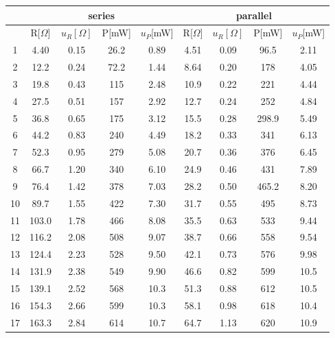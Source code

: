\documentclass[12pt]{article}
\begin{document}
\begin{table}[H]
\centering
\begin{tabular}{|c|c|c|c|c|c|c|c|c|}
\hline
   & \multicolumn{4}{c|}{series}      & \multicolumn{4}{c|}{parallel}      \\ \hline
   & R[$\Omega$]     &$u_R [\Omega]$  &P[mW] &$u_P$[mW]     & R[$\Omega$]     & $u_R [\Omega]$     &P[mW]&$u_P$[mW]    \\ \hline 
1  & 4.40     & 0.15      & 26.2 &0.89    & 4.51     & 0.09     & 96.5  &2.11   \\ \hline
2  & 12.2     & 0.24      & 72.2 &1.44    & 8.64     & 0.20     & 178   &4.05   \\ \hline
3  & 19.8     & 0.43      & 115  &2.48    & 10.9     & 0.22     & 221   &4.44   \\ \hline
4  & 27.5     & 0.51      & 157  &2.92    & 12.7     & 0.24     & 252   &4.84   \\ \hline
5  & 36.8     & 0.65      & 175  &3.12    & 15.5     & 0.28     & 298.9 &5.49   \\ \hline
6  & 44.2     & 0.83      & 240  &4.49    & 18.2     & 0.33     & 341   &6.13   \\ \hline
7  & 52.3     & 0.95      & 279  &5.08    & 20.7     & 0.36     & 376   &6.45   \\ \hline
8  & 66.7     & 1.20      & 340  &6.10    & 24.9     & 0.46     & 431   &7.89   \\ \hline
9  & 76.4     & 1.42      & 378  &7.03    & 28.2     & 0.50     & 465.2 &8.20   \\ \hline
10 & 89.7     & 1.55      & 422  &7.30    & 31.7     & 0.55     & 495   &8.73   \\ \hline
11 & 103.0    & 1.78      & 466  &8.08    & 35.5     & 0.63     & 533   &9.44   \\ \hline
12 & 116.2    & 2.08      & 508  &9.07    & 38.7     & 0.66     & 558   &9.54   \\ \hline
13 & 124.4    & 2.23      & 528  &9.50    & 42.1     & 0.73     & 576   &9.98   \\ \hline
14 & 131.9    & 2.38      & 549  &9.90    & 46.6     & 0.82     & 599   &10.5   \\ \hline
15 & 139.1    & 2.52      & 568  &10.3    & 51.3     & 0.88     & 612   &10.5   \\ \hline
16 & 154.3    & 2.66      & 599  &10.3    & 58.1     & 0.98     & 618   &10.4   \\ \hline
17 & 163.3    & 2.84      & 614  &10.7    & 64.7     & 1.13     & 620   &10.9   \\ \hline

\end{tabular}
\end{table}
\end{document}
